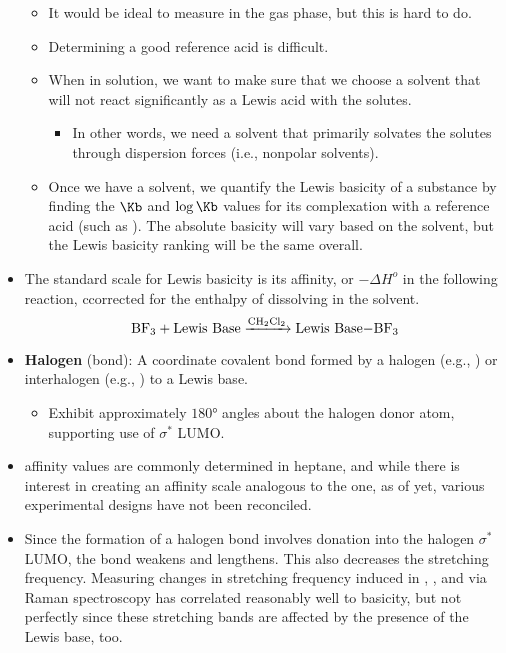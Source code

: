 \documentclass[../notes.tex]{subfiles}
\begin{document}
\begin{itemize}
    \begin{itemize}
        \item It would be ideal to measure in the gas phase, but this is hard to do.
        \item Determining a good reference acid is difficult.
        \item When in solution, we want to make sure that we choose a solvent that will not react significantly as a Lewis acid with the solutes.
        \begin{itemize}
            \item In other words, we need a solvent that primarily solvates the solutes through dispersion forces (i.e., nonpolar solvents).
        \end{itemize}
        \item Once we have a solvent, we quantify the Lewis basicity of a substance by finding the $\Kb$ and $\log\Kb$ values for its complexation with a reference acid (such as ). The absolute basicity will vary based on the solvent, but the Lewis basicity ranking will be the same overall.
    \end{itemize}
    \item The standard scale for Lewis basicity is its  affinity, or $-\Delta H^o$ in the following reaction, ccorrected for the enthalpy of  dissolving in the solvent.
    \begin{equation*}
        \ce{BF3 + \text{Lewis Base} ->[CH2Cl2] \text{Lewis Base}-BF3}
    \end{equation*}
    \item \textbf{Halogen} (bond): A coordinate covalent bond formed by a halogen  (e.g., ) or interhalogen  (e.g., ) to a Lewis base.
    \begin{itemize}
        \item Exhibit approximately $\ang{180}$ angles about the halogen donor atom, supporting use of $\sigma^*$ LUMO.
    \end{itemize}
    \item {} affinity values are commonly determined in heptane, and while there is interest in creating an  affinity scale analogous to the  one, as of yet, various experimental designs have not been reconciled.
    \item Since the formation of a halogen bond involves donation into the halogen $\sigma^*$ LUMO, the  bond weakens and lengthens. This also decreases the stretching frequency. Measuring changes in stretching frequency induced in , , and  via Raman spectroscopy has correlated reasonably well to basicity, but not perfectly since these stretching bands are affected by the presence of the Lewis base, too.

\end{itemize}
\end{document}
